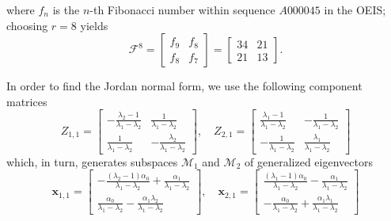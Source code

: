 \begin{example}
\begin{displaymath}
\end{displaymath}
where $f_{n}$ is the $n$-th Fibonacci number within sequence $A000045$ in the
OEIS; choosing $r=8$ yields
\begin{displaymath}
\mathcal{F}^{8} = \left[\begin{matrix}f_{9} & f_{8}\\f_{8} & f_{7}\end{matrix}\right] = \left[\begin{matrix}34 & 21\\21 & 13\end{matrix}\right].
\end{displaymath}

In order to find the Jordan normal form, we use the following component matrices
\begin{displaymath}
Z_{1,1} = \left[\begin{matrix}- \frac{\lambda_{2} - 1}{\lambda_{1} - \lambda_{2}} & \frac{1}{\lambda_{1} - \lambda_{2}}\\\frac{1}{\lambda_{1} - \lambda_{2}} & - \frac{\lambda_{2}}{\lambda_{1} - \lambda_{2}}\end{matrix}\right], \quad Z_{2,1} = \left[\begin{matrix}\frac{\lambda_{1} - 1}{\lambda_{1} - \lambda_{2}} & - \frac{1}{\lambda_{1} - \lambda_{2}}\\- \frac{1}{\lambda_{1} - \lambda_{2}} & \frac{\lambda_{1}}{\lambda_{1} - \lambda_{2}}\end{matrix}\right]
\end{displaymath}
which, in turn, generates subspaces $\mathcal{M}_{1}$ and $\mathcal{M}_{2}$ of
generalized eigenvectors
\begin{displaymath}
\boldsymbol{x}_{1,1} = \left[\begin{matrix}- \frac{\left(\lambda_{2} - 1\right) \alpha_{0}}{\lambda_{1} - \lambda_{2}} + \frac{\alpha_{1}}{\lambda_{1} - \lambda_{2}}\\\frac{\alpha_{0}}{\lambda_{1} - \lambda_{2}} - \frac{\alpha_{1} \lambda_{2}}{\lambda_{1} - \lambda_{2}}\end{matrix}\right], \quad \boldsymbol{x}_{2,1} = \left[\begin{matrix}\frac{\left(\lambda_{1} - 1\right) \alpha_{0}}{\lambda_{1} - \lambda_{2}} - \frac{\alpha_{1}}{\lambda_{1} - \lambda_{2}}\\- \frac{\alpha_{0}}{\lambda_{1} - \lambda_{2}} + \frac{\alpha_{1} \lambda_{1}}{\lambda_{1} - \lambda_{2}}\end{matrix}\right]
\end{displaymath}

\end{example}
